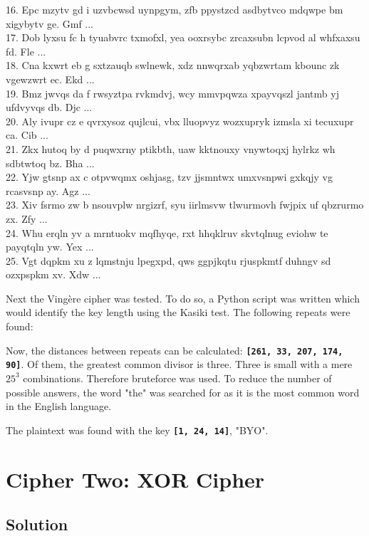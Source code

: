 \documentclass{article}
\begin{document}
{{16. Epc mzytv gd i uzvbcwsd uynpgym, zfb ppystzcd asdbytvco mdqwpe bm xigybytv ge. Gmf ...\\
17. Dob lyxsu fc h tyuabvrc txmofxl, yea ooxrsybc zrcaxsubn lcpvod al whfxaxsu fd. Fle ...\\
18. Cna kxwrt eb g sxtzauqb swlnewk, xdz nnwqrxab yqbzwrtam kbounc zk vgewzwrt ec. Ekd ...\\
19. Bmz jwvqs da f rwsyztpa rvkmdvj, wcy mmvpqwza xpayvqszl jantmb yj ufdvyvqs db. Djc ...\\
20. Aly ivupr cz e qvrxysoz qujlcui, vbx lluopvyz wozxupryk izmsla xi tecuxupr ca. Cib ...\\
21. Zkx hutoq by d puqwxrny ptikbth, uaw kktnouxy vnywtoqxj hylrkz wh sdbtwtoq bz. Bha ...\\
22. Yjw gtsnp ax c otpvwqmx oshjasg, tzv jjsmntwx umxvsnpwi gxkqjy vg rcasvsnp ay. Agz ...\\
23. Xiv fsrmo zw b nsouvplw nrgizrf, syu iirlmsvw tlwurmovh fwjpix uf qbzrurmo zx. Zfy ...\\
24. Whu erqln yv a mrntuokv mqfhyqe, rxt hhqklruv skvtqlnug eviohw te payqtqln yw. Yex ...\\
25. Vgt dqpkm xu z lqmstnju lpegxpd, qws ggpjkqtu rjuspkmtf duhngv sd ozxpspkm xv. Xdw ...
}}

Next the Vingère cipher was tested. To do so, a Python script was written which would identify the key length using the Kasiki test. The following repeats were found:

\textbf{}

Now, the distances between repeats can be calculated: \textbf{\lstinline{[261, 33, 207, 174, 90]}}. Of them, the greatest common divisor is three. Three is small with a mere $25^3$ combinations. Therefore bruteforce was used. To reduce the number of possible answers, the word "the" was searched for as it is the most common word in the English language.

The plaintext was found with the key \textbf{\lstinline{[1, 24, 14]}}, "BYO".

\clearpage

\section{Cipher Two: XOR Cipher}

\subsection{Solution}
\end{document}
